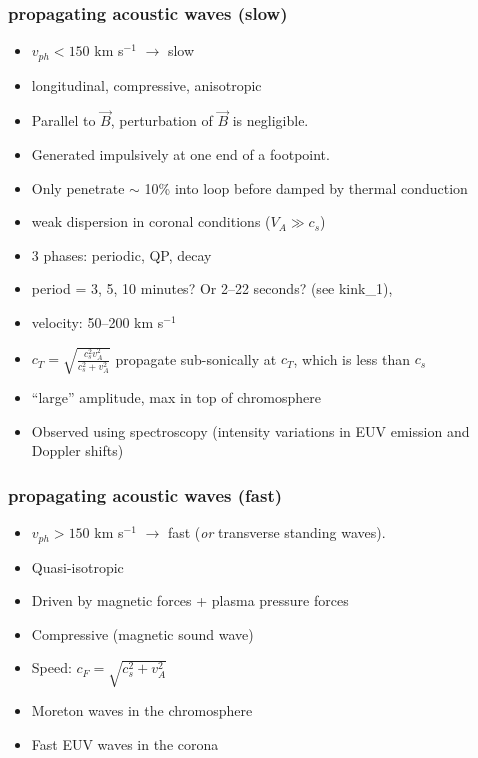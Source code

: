 \documentclass{article}
\begin{document}
\subsubsection{propagating acoustic waves (slow)}
\begin{itemize}
    \item $v_{ph}<150$ km s$^{-1}$ $\rightarrow$ slow
    \item longitudinal, compressive, anisotropic
    \item Parallel to $\vec{B}$, perturbation of $\vec{B}$ is negligible.
    \item Generated impulsively at one end of a footpoint.
    \item Only penetrate $\sim$ 10\% into loop before
        damped by thermal conduction
    \item weak dispersion in coronal conditions ($V_{A} \gg c_{s}$)
    \item 3 phases: periodic, QP, decay
    \item period = 3, 5, 10 minutes? Or 2--22 seconds? (see kink\_1),
    \item velocity: 50--200 km s$^{-1}$
    \item $c_{T} = \sqrt{\frac{c_{s}^2v_{A}^2}{c_{s}^2 + v_{A}^2}} $
        propagate sub-sonically at $c_{T}$, which is less than $c_{s}$
    \item ``large'' amplitude, max in top of chromosphere
    \item Observed using spectroscopy (intensity variations in
        EUV emission  and Doppler shifts)
\end{itemize}
\subsubsection{propagating acoustic waves (fast)}
\begin{itemize}
    \item $v_{ph}>150$ km s$^{-1}$ $\rightarrow$ fast
        (\emph{or} transverse standing waves).
    \item Quasi-isotropic
    \item Driven by magnetic forces + plasma pressure forces
    \item Compressive (magnetic sound wave)
    \item Speed: $c_{F} = \sqrt{c_{s}^2 + v_{A}^2} $
    \item Moreton waves in the chromosphere
    \item Fast EUV waves in the corona
\end{itemize}
\end{document}
